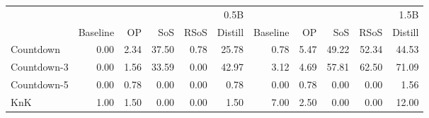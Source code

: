 \begin{tabular}{lrrrrrrrrrr}
\toprule
 & \multicolumn{5}{r}{0.5B} & \multicolumn{5}{r}{1.5B} \\
 & Baseline & OP & SoS & RSoS & Distill & Baseline & OP & SoS & RSoS & Distill \\
\midrule
Countdown & 0.00 & 2.34 & 37.50 & 0.78 & 25.78 & 0.78 & 5.47 & 49.22 & 52.34 & 44.53 \\
Countdown-3 & 0.00 & 1.56 & 33.59 & 0.00 & 42.97 & 3.12 & 4.69 & 57.81 & 62.50 & 71.09 \\
Countdown-5 & 0.00 & 0.78 & 0.00 & 0.00 & 0.78 & 0.00 & 0.78 & 0.00 & 0.00 & 1.56 \\
KnK & 1.00 & 1.50 & 0.00 & 0.00 & 1.50 & 7.00 & 2.50 & 0.00 & 0.00 & 12.00 \\
\bottomrule
\end{tabular}
